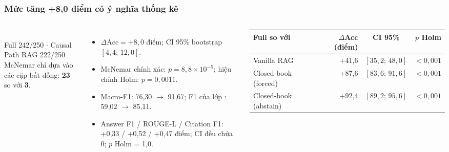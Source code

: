 \begin{frame}
\frametitle{Mức tăng +8,0 điểm có ý nghĩa thống kê}
\begin{columns}[T,onlytextwidth]
\centering
{}\\[2pt]
\footnotesize Full 242/250 $\cdot$ Causal Path RAG 222/250\\
\dien McNemar chỉ dựa vào các cặp bất đồng: \textbf{23} so với \textbf{3}.

\footnotesize
\begin{itemize}
  \item $\Delta\text{Acc}=+8{,}0$ điểm; CI 95\% bootstrap $[4{,}4;\,12{,}0]$.
  \item McNemar chính xác: $p=8{,}8\times10^{-5}$; hiệu chỉnh Holm: $p=0{,}0011$.
  \item Macro-F1: 76,30 $\rightarrow$ 91,67; F1 của lớp \labRejS: 59,02 $\rightarrow$ 85,11.
  \item Answer F1 / ROUGE-L / Citation F1: +0,33 / +0,52 / +0,47 điểm; CI đều chứa 0; $p$ Holm = 1,0.
\end{itemize}

\vspace{0.1cm}
{\scriptsize
\setlength{\tabcolsep}{4pt}
\begin{tabular}{@{}l r c r@{}}
\toprule
\textbf{Full so với} & \textbf{$\Delta$Acc (điểm)} & \textbf{CI 95\%} & \textbf{$p$ Holm}\\
\midrule
Vanilla RAG & +41,6 & $[35{,}2;\,48{,}0]$ & $<0{,}001$\\
Closed-book (forced) & +87,6 & $[83{,}6;\,91{,}6]$ & $<0{,}001$\\
Closed-book (abstain) & +92,4 & $[89{,}2;\,95{,}6]$ & $<0{,}001$\\
\bottomrule
\end{tabular}}
\end{columns}

\vspace{0.15cm}
\end{frame}

